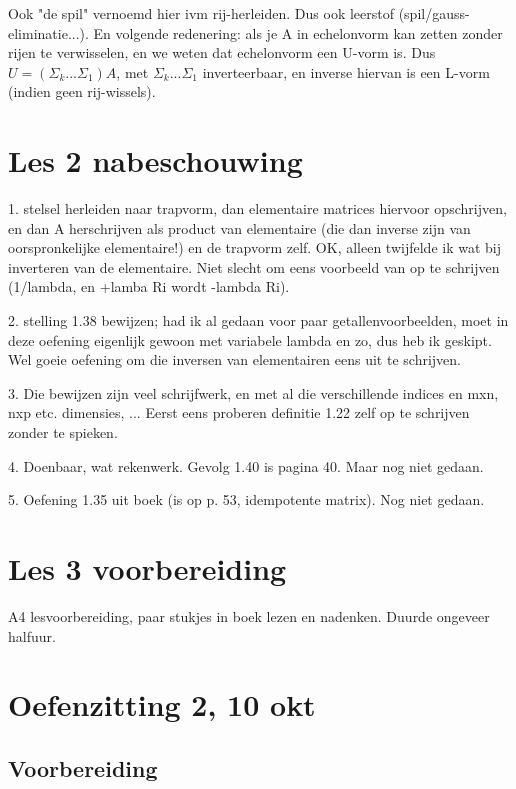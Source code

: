 \documentclass{article}
\begin{document}
Ook "de spil" vernoemd hier ivm rij-herleiden. Dus ook leerstof (spil/gauss-eliminatie...). En volgende redenering: als je A in echelonvorm kan zetten zonder rijen te verwisselen, en we weten dat echelonvorm een U-vorm is. Dus $U= (\Sigma_k ... \Sigma_1) A$, met $\Sigma_k ... \Sigma_1$ inverteerbaar, en inverse hiervan is een L-vorm (indien geen rij-wissels). 

\section{Les 2 nabeschouwing}

1. stelsel herleiden naar trapvorm, dan elementaire matrices hiervoor opschrijven, en dan A herschrijven als product van elementaire (die dan inverse zijn van oorspronkelijke elementaire!) en de trapvorm zelf. 
OK, alleen twijfelde ik wat bij inverteren van de elementaire. Niet slecht om eens voorbeeld van op te schrijven (1/lambda, en +lamba Ri wordt -lambda Ri). 

2. stelling 1.38 bewijzen; had ik al gedaan voor paar getallenvoorbeelden, moet in deze oefening eigenlijk gewoon met variabele lambda en zo, dus heb ik geskipt. Wel goeie oefening om die inversen van elementairen eens uit te schrijven. 

3. Die bewijzen zijn veel schrijfwerk, en met al die verschillende indices en mxn, nxp etc. dimensies, ... Eerst eens proberen definitie 1.22 zelf op te schrijven zonder te spieken. 

4. Doenbaar, wat rekenwerk. Gevolg 1.40 is pagina 40. Maar nog niet gedaan. 

5. Oefening 1.35 uit boek (is op p. 53, idempotente matrix). Nog niet gedaan. 

\section{Les 3 voorbereiding}

A4 lesvoorbereiding, paar stukjes in boek lezen en nadenken. Duurde ongeveer halfuur. 


\section{Oefenzitting 2, 10 okt}

\subsection{Voorbereiding}
\end{document}
